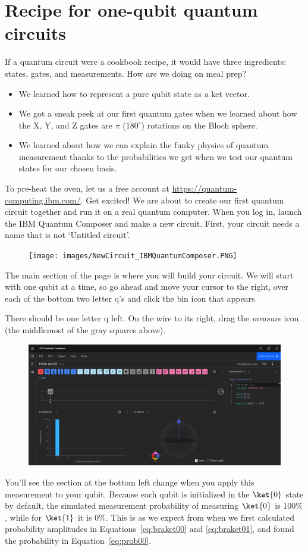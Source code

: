 \documentclass{article}
\theoremstyle{definition}
\begin{document}
\section{Recipe for one-qubit quantum circuits}
If a quantum circuit were a cookbook recipe, it would have three ingredients: states, gates, and measurements.
How are we doing on meal prep?
\begin{itemize}
	\item We learned how to represent a pure qubit state as a ket vector.
	\item We got a sneak peek at our first quantum gates when we learned about how the X, Y, and Z gates are $\pi$ ($180^{\circ}$) rotations on the Bloch sphere.
	\item We learned about how we can explain the funky physics of quantum measurement thanks to the probabilities we get when we test our quantum states for our chosen basis.
\end{itemize}
To pre-heat the oven, let us a free account at \url{https://quantum-computing.ibm.com/}.  Get excited!  We are about to create our first quantum circuit together and run it on a real quantum computer.
When you log in, launch the IBM Quantum Composer and make a new circuit.
First, your circuit needs a name that is not `Untitled circuit'.
\begin{figure}[H]
	\texttt{[image: images/NewCircuit\_IBMQuantumComposer.PNG]}
\end{figure}
The main section of the page is where you will build your circuit.  We will start with one qubit at a time, so go ahead and move your cursor to the right, over each of the bottom two letter q's and click the bin icon that appears.

There should be one letter q left.  On the wire to its right, drag the \textit{measure} icon (the middlemost of the gray squares above).
\begin{figure}[H]
	\includegraphics[width=\columnwidth]{images/Measure_IBMQuantumComposer.PNG}
\end{figure}
You'll see the section at the bottom left change when you apply this measurement to your qubit.  Because each qubit is initialized in the $\ket{0}$ state by default, the simulated measurement probability of measuring $\ket{0}$ is $100\%$, while for $\ket{1}$ it is $0\%$.  This is as we expect from when we first calculated probability amplitudes in Equations~\ref{eq:braket00} and \ref{eq:braket01}, and found the probability in Equation~\ref{eq:prob00}.
\end{document}
